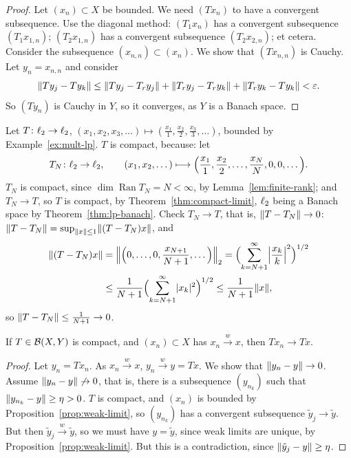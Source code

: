 \begin{proof}
Let $(x_n) \subset X$ be bounded. We need $(Tx_n)$ to have a convergent
subsequence. Use the diagonal method: $(T_1 x_n)$ has a convergent
subsequence $(T_1 x_{1,n})$; $(T_2 x_{1,n})$ has a convergent subsequence
$(T_2 x_{2,n})$; et cetera. Consider the subsequence
$(x_{n,n}) \subset (x_n)$. We show that $(Tx_{n,n})$ is Cauchy. Let
$y_n = x_{n,n}$ and consider
\[
  \lVert Ty_j - Ty_k\rVert
  \le \lVert Ty_j - T_r y_j\rVert + \lVert T_r y_j - T_r y_k\rVert
    + \lVert T_r y_k - T y_k\rVert < \varepsilon .
\]
So $(Ty_n)$ is Cauchy in $Y$, so it converges, as $Y$ is a Banach space.
\end{proof}

\begin{example}\label{ex:diagonal-compact}
Let $T \colon \ell_{2} \to \ell_{2}$,
$(x_1, x_2, x_3, \dots) \mapsto (\frac{x_1}{1}, \frac{x_2}{2},
\frac{x_3}{3}, \dots)$, bounded by Example~\ref{ex:mult-lp}. $T$ is compact,
because: let
\[
  T_N \colon \ell_{2} \to \ell_{2}, \qquad (x_1, x_2, \dots) \longmapsto
  \Bigl(\frac{x_1}{1}, \frac{x_2}{2}, \dots, \frac{x_N}{N}, 0, 0, \dots
  \Bigr) .
\]
$T_N$ is compact, since $\dim \operatorname{Ran} T_N = N < \infty$, by
Lemma~\ref{lem:finite-rank}; and $T_N \to T$, so $T$ is compact, by
Theorem~\ref{thm:compact-limit}, $\ell_{2}$ being a Banach space by
Theorem~\ref{thm:lp-banach}. Check $T_N \to T$, that is,
$\lVert T - T_N\rVert \to 0$: $\lVert T - T_N\rVert = \sup_{\lVert x\rVert \le 1}
\lVert(T - T_N)x\rVert$, and
\[
  \begin{aligned}
    \lVert(T - T_N)x\rVert
    &= \Bigl\lVert \Bigl(0, \dots, 0, \frac{x_{N+1}}{N+1}, \dots\Bigr)
      \Bigr\rVert_2
    = \Bigl(\sum_{k=N+1}^{\infty} \Bigl\lvert \frac{x_k}{k} \Bigr\rvert^2
      \Bigr)^{1/2} \\
    &\le \frac{1}{N+1} \Bigl(\sum_{k=N+1}^{\infty} \lvert x_k\rvert^2\Bigr)^{1/2}
    \le \frac{1}{N+1} \lVert x\rVert ,
  \end{aligned}
\]
so $\lVert T - T_N\rVert \le \frac{1}{N+1} \to 0$.
\end{example}

\begin{theorem}\label{thm:compact-weak-strong}
If $T \in \mathcal{B}(X, Y)$ is compact, and $(x_n) \subset X$ has
$x_n \xrightarrow{w} x$, then $Tx_n \to Tx$.
\end{theorem}

\begin{proof}
Let $y_n = Tx_n$. As $x_n \xrightarrow{w} x$, $y_n \xrightarrow{w} y = Tx$.
We show that $\lVert y_n - y\rVert \to 0$. Assume $\lVert y_n - y\rVert \not\to 0$, that
is, there is a subsequence $(y_{n_k})$ such that
$\lVert y_{n_k} - y\rVert \ge \eta > 0$. $T$ is compact, and $(x_n)$ is bounded by
Proposition~\ref{prop:weak-limit}, so $(y_{n_k})$ has a convergent
subsequence $\tilde{y}_j \to \tilde{y}$. But then
$\tilde{y}_j \xrightarrow{w} \tilde{y}$, so we must have $y = \tilde{y}$,
since weak limits are unique, by Proposition~\ref{prop:weak-limit}. But this
is a contradiction, since $\lVert\tilde{y}_j - y\rVert \ge \eta$.
\end{proof}

